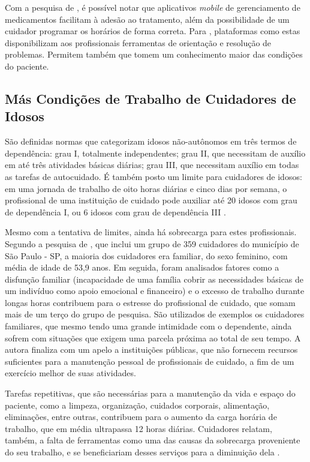 \documentclass[
	article,			%
	12pt,				%
	oneside,			%
	a4paper,			%
    BIBLATEX,           %
	english,			%
	brazil,				%
	sumario=tradicional
	]{abntex2}
\begin{document}
Com a pesquisa de , é possível notar que aplicativos \textit{mobile} de gerenciamento de medicamentos facilitam à adesão ao tratamento, além da possibilidade de um cuidador programar os horários de forma correta. Para , plataformas como estas disponibilizam aos profissionais ferramentas de orientação e resolução de problemas. Permitem também que tomem um conhecimento maior das condições do paciente.

\subsection{Más Condições de Trabalho de Cuidadores de Idosos}

São definidas normas que categorizam idosos não-autônomos em três termos de dependência: grau I, totalmente independentes; grau II, que necessitam de auxílio em até três atividades básicas diárias; grau III, que necessitam auxílio em todas as tarefas de autocuidado. É também posto um limite para cuidadores de idosos: em uma jornada de trabalho de oito horas diárias e cinco dias por semana, o profissional de uma instituição de cuidado pode auxiliar até 20 idosos com grau de dependência I, ou 6 idosos com grau de dependência III \cite{ministeriosaude2021ilpi}.

Mesmo com a tentativa de limites, ainda há sobrecarga para estes profissionais. Segundo a pesquisa de \cite{nunes2018sabe}, que inclui um grupo de 359 cuidadores do município de São Paulo - SP, a maioria dos cuidadores era familiar, do sexo feminino, com média de idade de 53,9 anos. Em seguida, foram analisados fatores como a disfunção familiar (incapacidade de uma família cobrir as necessidades básicas de um indivíduo como apoio emocional e financeiro) e o excesso de trabalho durante longas horas contribuem para o estresse do profissional de cuidado, que somam mais de um terço do grupo de pesquisa. São utilizados de exemplos os cuidadores familiares, que mesmo tendo uma grande intimidade com o dependente, ainda sofrem com situações que exigem uma parcela próxima ao total de seu tempo. A autora finaliza com um apelo a instituições públicas, que não fornecem recursos suficientes para a manutenção pessoal de profissionais de cuidado, a fim de um exercício melhor de suas atividades.

Tarefas repetitivas, que são necessárias para a manutenção da vida e espaço do paciente, como a limpeza, organização, cuidados corporais, alimentação, eliminações, entre outras, contribuem para o aumento da carga horária de trabalho, que em média ultrapassa 12 horas diárias. Cuidadores relatam, também, a falta de ferramentas como uma das causas da sobrecarga proveniente do seu trabalho, e se beneficiariam desses serviços para a diminuição dela \cite{aline2012sobrecarga}.
\end{document}
